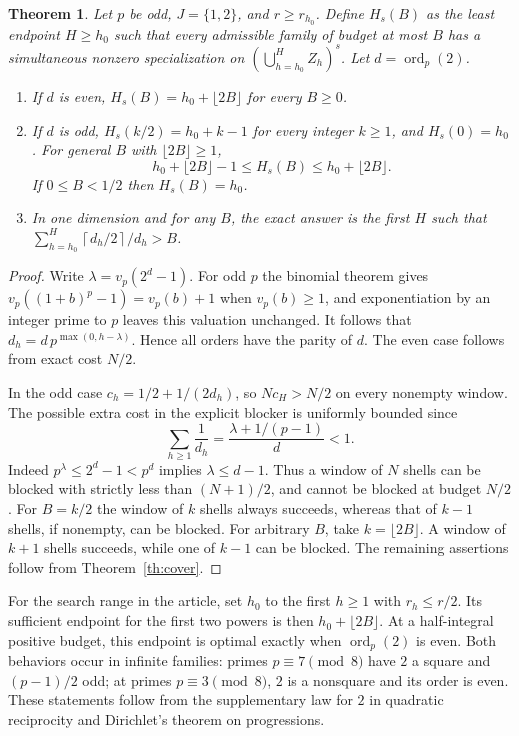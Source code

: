 \documentclass[11pt]{article}
\newtheorem{theorem}{Theorem}[section]
\theoremstyle{definition}\newtheorem{example}[theorem]{Example}
\newcommand{\ord}{\operatorname{ord}}
\newcommand{\ceil}[1]{\left\lceil #1\right\rceil}
\begin{document}
\begin{theorem}\label{th:end}
Let $p$ be odd, $J=\{1,2\}$, and $r\ge r_{h_0}$. Define $H_s(B)$
as the least endpoint $H\ge h_0$ such that every admissible family of
budget at most $B$ has a simultaneous nonzero specialization on
$(\bigcup_{h=h_0}^H Z_h)^s$. Let $d=\ord_p(2)$.
\begin{enumerate}
\item If $d$ is even, $H_s(B)=h_0+\lfloor 2B\rfloor$ for every $B\ge0$.
\item If $d$ is odd, $H_s(k/2)=h_0+k-1$ for every integer $k\ge1$,
and $H_s(0)=h_0$. For general $B$ with $\lfloor2B\rfloor\ge1$,
\[
 h_0+\lfloor 2B\rfloor-1\le H_s(B)\le h_0+\lfloor2B\rfloor.
\]
If $0\le B<1/2$ then $H_s(B)=h_0$.
\item In one dimension and for any $B$, the exact answer is the first $H$
such that $\sum_{h=h_0}^H\ceil{d_h/2}/d_h>B$.
\end{enumerate}
\end{theorem}
\begin{proof}
Write $\lambda=v_p(2^d-1)$. For odd $p$ the binomial theorem gives
$v_p((1+b)^p-1)=v_p(b)+1$ when $v_p(b)\ge1$, and exponentiation by an
integer prime to $p$ leaves this valuation unchanged. It follows that
$d_h=d\,p^{\max(0,h-\lambda)}$. Hence all orders have the parity of $d$.
The even case follows from exact cost $N/2$.

In the odd case $c_h=1/2+1/(2d_h)$, so $Nc_H>N/2$ on every nonempty window.
The possible extra cost in the explicit blocker is uniformly bounded since
\[
 \sum_{h\ge1}\frac1{d_h}=\frac{\lambda+1/(p-1)}{d}<1.
\]
Indeed $p^\lambda\le 2^d-1<p^d$ implies $\lambda\le d-1$.
Thus a window of $N$ shells can be blocked with strictly less than
$(N+1)/2$, and cannot be blocked at budget $N/2$. For $B=k/2$ the window
of $k$ shells always succeeds, whereas that of $k-1$ shells, if nonempty,
can be blocked. For arbitrary $B$, take $k=\lfloor2B\rfloor$. A window
of $k+1$ shells succeeds, while one of $k-1$ can be blocked. The remaining
assertions follow from Theorem~\ref{th:cover}.
\end{proof}

For the search range in the article, set $h_0$ to the first $h\ge1$ with
$r_h\le r/2$. Its sufficient endpoint for the first two powers is then
$h_0+\lfloor2B\rfloor$. At a half-integral positive budget, this endpoint
is optimal exactly when $\ord_p(2)$ is even. Both behaviors occur in
infinite families: primes $p\equiv7\pmod8$ have $2$ a square and
$(p-1)/2$ odd; at primes $p\equiv3\pmod8$, $2$ is a nonsquare and its
order is even. These statements follow from the supplementary law for $2$
in quadratic reciprocity and Dirichlet's theorem on progressions.
\end{document}
